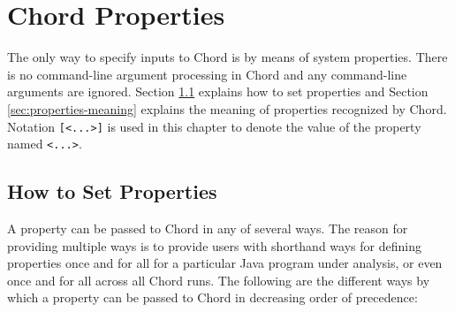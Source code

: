 \chapter{Chord Properties}
\label{chap:properties}

The only way to specify inputs to Chord is by means of system properties.  There
is no command-line argument processing in Chord and any command-line arguments
are ignored.  Section \ref{sec:properties-setting} explains how to set
properties and Section \ref{sec:properties-meaning} explains the meaning of
properties recognized by Chord.
Notation {\tt [<...>]} is used in this chapter to denote the value of the property named {\tt <...>}.

\section{How to Set Properties}
\label{sec:properties-setting}

A property can be passed to Chord in any of several ways.  The reason for
providing multiple ways is to provide users with shorthand ways for defining
properties once and for all for a particular Java program under analysis, or
even once and for all across all Chord runs.  The following are the different
ways by which a property can be passed to Chord in decreasing order of
precedence:

